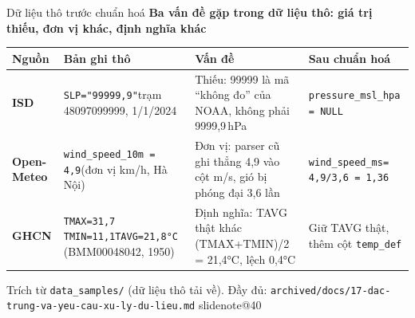 \documentclass[t,aspectratio=169,12pt]{beamer}
\makeatletter
\newcommand{\slidenote}[1]{\ifcsname slidenote@#1\endcsname\note{\csname slidenote@#1\endcsname}\fi}
\newcommand{\ychinh}[1]{\vskip1mm{\bfseries #1}\par\vskip1mm}
\newcommand{\nguon}[1]{\vskip1mm{\scriptsize\color{mutedgray}#1}}
\makeatother
\begin{document}
\begin{frame}{Dữ liệu thô trước chuẩn hoá}
  \ychinh{Ba vấn đề gặp trong dữ liệu thô: giá trị thiếu, đơn vị khác, định nghĩa khác}
  \scriptsize
  \begin{tabular}{@{}>{\bfseries}p{1.5cm}p{3.9cm}p{4.4cm}p{3.6cm}@{}}
    \toprule
    Nguồn & Bản ghi thô & Vấn đề & Sau chuẩn hoá \\
    \midrule
    ISD & \texttt{SLP="99999,9"}\newline trạm 48097099999, 1/1/2024 &
    \textcolor{badred}{Thiếu}: 99999 là mã ``không đo'' của NOAA, không phải 9999,9\,hPa &
    \texttt{pressure\_msl\_hpa = NULL} \\ \addlinespace[3pt]
    Open-Meteo & \texttt{wind\_speed\_10m = 4,9}\newline (đơn vị km/h, Hà Nội) &
    \textcolor{badred}{Đơn vị}: parser cũ ghi thẳng 4,9 vào cột m/s, gió bị phóng đại 3,6 lần &
    \texttt{wind\_speed\_ms}\newline\texttt{= 4,9/3,6 = 1,36} \\ \addlinespace[3pt]
    GHCN & \texttt{TMAX=31,7 TMIN=11,1}\newline\texttt{TAVG=21,8°C} (BMM00048042, 1950) &
    \textcolor{warnorange}{Định nghĩa}: TAVG thật khác (TMAX+TMIN)/2 = 21,4°C, lệch 0,4°C &
    Giữ TAVG thật, thêm cột \texttt{temp\_def} \\
    \bottomrule
  \end{tabular}
  \nguon{Trích từ \texttt{data\_samples/} (dữ liệu thô tải về). Đầy đủ: \texttt{archived/docs/17-dac-trung-va-yeu-cau-xu-ly-du-lieu.md}}
  \slidenote{40}
\end{frame}
\end{document}
